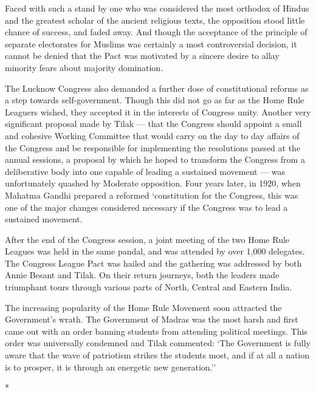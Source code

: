 Faced with such a stand by one who was considered the most orthodox of Hindus and the greatest scholar of the ancient religious texts, the opposition stood little chance of success, and faded away. And though the acceptance of the principle of separate electorates for Muslims was certainly a most controversial decision, it cannot be denied that the Pact was motivated by a sincere desire to allay minority fears about majority domination.

The Lucknow Congress also demanded a further dose of constitutional reforms as a step towards self-government. Though this did not go as far as the Home Rule Leaguers wished, they accepted it in the interests of Congress unity. Another very significant proposal made by Tilak — that the Congress should appoint a small and cohesive Working Committee that would carry on the day to day affairs of the Congress and be responsible for implementing the resolutions passed at the annual sessions, a proposal by which he hoped to transform the Congress from a deliberative body into one capable of leading a sustained movement — was unfortunately quashed by Moderate opposition. Four years later, in 1920, when Mahatma Gandhi prepared a reformed `constitution for the Congress, this was one of the major changes considered necessary if the Congress was to lead a sustained movement.

After the end of the Congress session, a joint meeting of the two Home Rule Leagues was held in the same pandal, and was attended by over 1,000 delegates. The Congress League Pact was hailed and the gathering was addressed by both Annie Besant and Tilak. On their return journeys, both the leaders made triumphant tours through various parts of North, Central and Eastern India.

The increasing popularity of the Home Rule Movement soon attracted the Government's wrath. The Government of Madras was the most harsh and first came out with an order banning students from attending political meetings. This order was universally condemned and Tilak commented: `The Government is fully aware that the wave of patriotism strikes the students most, and if at all a nation is to prosper, it is through an energetic new generation.''

\begin{center}*\end{center}

\paragraph*{}


